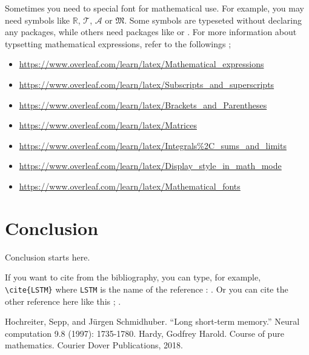 \documentclass{report}
\begin{document}
Sometimes you need to special font for mathematical use.
For example, you may need symbols like \(\mathbb R\), \(\mathcal T\), \(\mathscr A\) or \(\mathfrak M\).
Some symbols are typeseted without declaring any packages, while others need packages like  or .
For more information about typsetting mathematical expressions, refer to the followings ;
\begin{itemize}
\item
\url{https://www.overleaf.com/learn/latex/Mathematical_expressions}
\item
\url{https://www.overleaf.com/learn/latex/Subscripts_and_superscripts}
\item
\url{https://www.overleaf.com/learn/latex/Brackets_and_Parentheses}
\item
\url{https://www.overleaf.com/learn/latex/Matrices}
\item
\url{https://www.overleaf.com/learn/latex/Integrals\%2C_sums_and_limits}
\item
\url{https://www.overleaf.com/learn/latex/Display_style_in_math_mode}
\item
\url{https://www.overleaf.com/learn/latex/Mathematical_fonts}
\end{itemize}

\chapter{Conclusion}\label{chap:conclusion}
Conclusion starts here.

If you want to cite from the bibliography, you can type, for example, \verb|\cite{LSTM}| where \texttt{LSTM} is the name of the reference : \cite{LSTM}.
Or you can cite the other reference here like this ; \cite{pure}.

\renewcommand\bibname{Reference(or Bibliography)}
\begin{thebibliography}{AA}
 Hochreiter, Sepp, and Jürgen Schmidhuber. ``Long short-term memory.'' Neural computation 9.8 (1997): 1735-1780.
 Hardy, Godfrey Harold. Course of pure mathematics. Courier Dover Publications, 2018.
\end{thebibliography}
%
%
%
\end{document}
